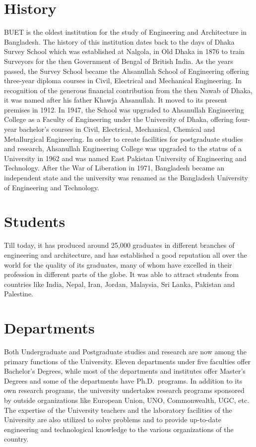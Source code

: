\section{History}
BUET is the oldest institution for the study of Engineering and
Architecture in Bangladesh. The history of this institution dates back
to the days of Dhaka Survey School which was established at
Nalgola, in Old Dhaka in 1876 to train Surveyors for
the then Government of Bengal of British India. As the years passed,
the Survey School became the Ahsanullah School of
Engineering offering
three-year diploma courses in Civil, Electrical and Mechanical
Engineering. In recognition of the generous financial contribution
from the then Nawab of Dhaka, it was named after his father Khawja
Ahsanullah. It moved to its present premises in 1912. In 1947, the
School was upgraded to Ahsanullah Engineering College as a Faculty of
Engineering under the University of Dhaka, offering four-year
bachelor’s courses in Civil, Electrical, Mechanical, Chemical and
Metallurgical Engineering. In order to create facilities for
postgraduate studies and research, Ahsanullah Engineering College was
upgraded to the status of a University in 1962 and was named East
Pakistan University of Engineering and Technology. After the War of
Liberation in 1971, Bangladesh became an independent state and the
university was renamed as the Bangladesh University of Engineering and
Technology.
 
\section{Students}
Till today, it has produced around 25,000 graduates in different
branches of engineering and architecture, and has established a good
reputation all over the world for the quality of its graduates, many
of whom have excelled in their profession in different parts of the
globe. It was able to attract students from countries like
India, Nepal, Iran,
Jordan, Malaysia, Sri Lanka, Pakistan and Palestine.
 
\section{Departments}
Both Undergraduate and Postgraduate studies and research are now among
the primary functions of the University. Eleven departments under five
faculties offer Bachelor's Degrees, while most of the departments and
institutes offer Master's Degrees and some of the departments have
Ph.D.\ programs. In addition to its own research programs, the
university undertakes research programs sponsored by outside
organizations like European Union, UNO,
Commonwealth, UGC, etc. The expertise
of the University teachers and the laboratory facilities of the
University are also utilized to solve problems and to provide
up-to-date engineering and technological knowledge to the various
organizations of the country.


\endinput